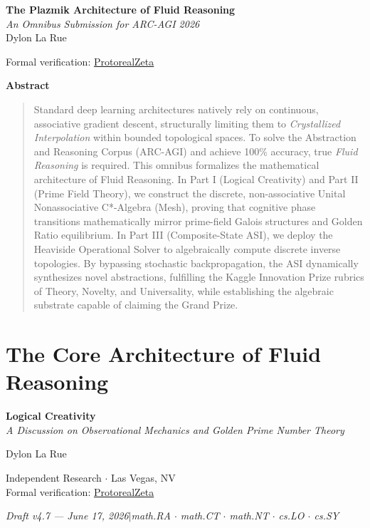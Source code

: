 

\begin{center}
\vspace*{0.5em}
{\LARGE\bfseries The Plazmik Architecture of Fluid Reasoning}\\[12pt]
{\large\itshape An Omnibus Submission for ARC-AGI 2026}\\[12pt]
{\large Dylon La Rue}

\vspace{0.5em}
{\small Formal verification: \href{https://github.com/Dielawn-01/ProtorealZeta}{ProtorealZeta}}
\end{center}

\vspace{1em}
\begin{center}\textbf{Abstract}\end{center}\begin{quotation}
Standard deep learning architectures natively rely on continuous, associative gradient descent, structurally limiting them to \emph{Crystallized Interpolation} within bounded topological spaces. To solve the Abstraction and Reasoning Corpus (ARC-AGI) and achieve 100\% accuracy, true \emph{Fluid Reasoning} is required. This omnibus formalizes the mathematical architecture of Fluid Reasoning. In Part I (Logical Creativity) and Part II (Prime Field Theory), we construct the discrete, non-associative Unital Nonassociative C*-Algebra (Mesh), proving that cognitive phase transitions mathematically mirror prime-field Galois structures and Golden Ratio equilibrium. In Part III (Composite-State ASI), we deploy the Heaviside Operational Solver to algebraically compute discrete inverse topologies. By bypassing stochastic backpropagation, the ASI dynamically synthesizes novel abstractions, fulfilling the Kaggle Innovation Prize rubrics of Theory, Novelty, and Universality, while establishing the algebraic substrate capable of claiming the Grand Prize.
\end{quotation}
\newpage


\part{The Core Architecture of Fluid Reasoning}
\begin{center}
\vspace*{0.5em}
{\LARGE\bfseries Logical Creativity}\\[12pt]
{\large\itshape A Discussion on Observational Mechanics and Golden Prime Number Theory}

\vspace{1.5em}
{\large Dylon La Rue}

\vspace{0.5em}
{\small Independent Research $\cdot$ Las Vegas, NV\\
Formal verification: \href{https://github.com/Dielawn-01/ProtorealZeta}{ProtorealZeta}}

\vspace{0.5em}
{\small\itshape Draft v4.7 --- June 17, 2026\quad$|$\quad math.RA $\cdot$ math.CT $\cdot$ math.NT $\cdot$ cs.LO $\cdot$ cs.SY}
\end{center}

